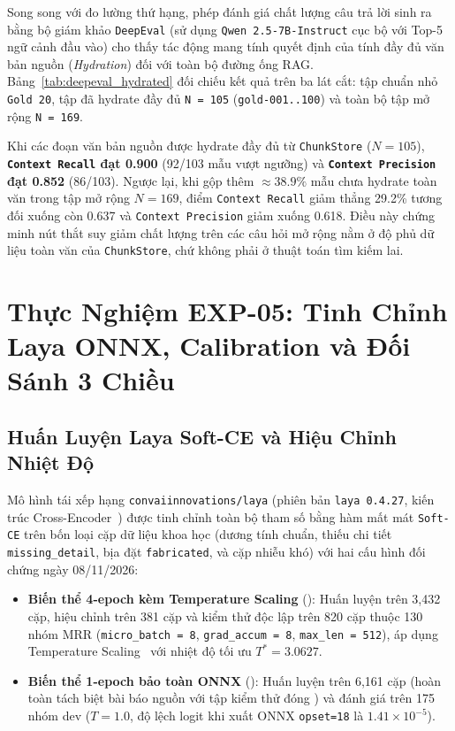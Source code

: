 Song song với đo lường thứ hạng, phép đánh giá chất lượng câu trả lời sinh ra bằng bộ giám khảo \texttt{DeepEval} (sử dụng \texttt{Qwen 2.5-7B-Instruct} cục bộ với Top-5 ngữ cảnh đầu vào) cho thấy tác động mang tính quyết định của tính đầy đủ văn bản nguồn (\textit{Hydration}) đối với toàn bộ đường ống RAG. Bảng~\ref{tab:deepeval_hydrated} đối chiếu kết quả trên ba lát cắt: tập chuẩn nhỏ \texttt{Gold 20}, tập đã hydrate đầy đủ \texttt{N = 105} (\texttt{gold-001..100}) và toàn bộ tập mở rộng \texttt{N = 169}.



Khi các đoạn văn bản nguồn được hydrate đầy đủ từ \texttt{ChunkStore} ($N=105$), \textbf{\texttt{Context Recall} đạt 0.900} (92/103 mẫu vượt ngưỡng) và \textbf{\texttt{Context Precision} đạt 0.852} (86/103). Ngược lại, khi gộp thêm $\approx 38.9\%$ mẫu chưa hydrate toàn văn trong tập mở rộng $N=169$, điểm \texttt{Context Recall} giảm thẳng 29.2\% tương đối xuống còn 0.637 và \texttt{Context Precision} giảm xuống 0.618. Điều này chứng minh nút thắt suy giảm chất lượng trên các câu hỏi mở rộng nằm ở độ phủ dữ liệu toàn văn của \texttt{ChunkStore}, chứ không phải ở thuật toán tìm kiếm lai.

\section{Thực Nghiệm EXP-05: Tinh Chỉnh Laya ONNX, Calibration và Đối Sánh 3 Chiều}
\label{sec:ch5_exp05}

\subsection{Huấn Luyện Laya Soft-CE và Hiệu Chỉnh Nhiệt Độ}
\label{sec:ch5_calibration}

Mô hình tái xếp hạng \texttt{convaiinnovations/laya} (phiên bản \texttt{laya 0.4.27}, kiến trúc Cross-Encoder~\cite{nogueira2019passage}) được tinh chỉnh toàn bộ tham số bằng hàm mất mát \texttt{Soft-CE} trên bốn loại cặp dữ liệu khoa học (dương tính chuẩn, thiếu chi tiết \texttt{missing\_detail}, bịa đặt \texttt{fabricated}, và cặp nhiễu khó) với hai cấu hình đối chứng ngày 08/11/2026:
\begin{itemize}
  \item \textbf{Biến thể 4-epoch kèm Temperature Scaling} (): Huấn luyện trên 3,432 cặp, hiệu chỉnh trên 381 cặp và kiểm thử độc lập trên 820 cặp thuộc 130 nhóm MRR (\texttt{micro\_batch = 8}, \texttt{grad\_accum = 8}, \texttt{max\_len = 512}), áp dụng Temperature Scaling~\cite{guo2017calibration} với nhiệt độ tối ưu $T^* = 3.0627$.
  \item \textbf{Biến thể 1-epoch bảo toàn ONNX} (): Huấn luyện trên 6,161 cặp (hoàn toàn tách biệt bài báo nguồn với tập kiểm thử đóng ) và đánh giá trên 175 nhóm dev ($T = 1.0$, độ lệch logit khi xuất ONNX \texttt{opset=18} là $1.41 \times 10^{-5}$).
\end{itemize}

